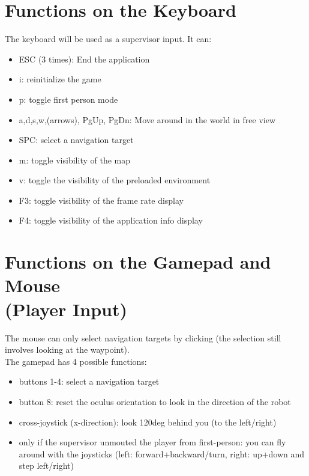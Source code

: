 \documentclass[a4paper, 12pt]{article}
\begin{document}
\section{Functions on the Keyboard}
The keyboard will be used as a supervisor input. It can:
\begin{itemize}
\item ESC (3 times): End the application
\item i: reinitialize the game
\item p: toggle first person mode
\item a,d,s,w,(arrows), PgUp, PgDn: Move around in the world in free view
\item SPC: select a navigation target
\item m: toggle visibility of the map
\item v: toggle the visibility of the preloaded environment
\item F3: toggle visibility of the frame rate display
\item F4: toggle visibility of the application info display
\end{itemize}

\section{Functions on the Gamepad and Mouse\\(Player Input)}
The mouse can only select navigation targets by clicking (the selection still involves looking at the waypoint).\\
The gamepad has 4 possible functions:
\begin{itemize}
\item buttons 1-4: select a navigation target
\item button 8: reset the oculus orientation to look in the direction of the robot
\item cross-joystick (x-direction): look 120deg behind you (to the left/right)
\item only if the supervisor unmouted the player from first-person: you can fly around with the joysticks (left: forward+backward/turn, right: up+down and step left/right)
\end{itemize}
\end{document}
